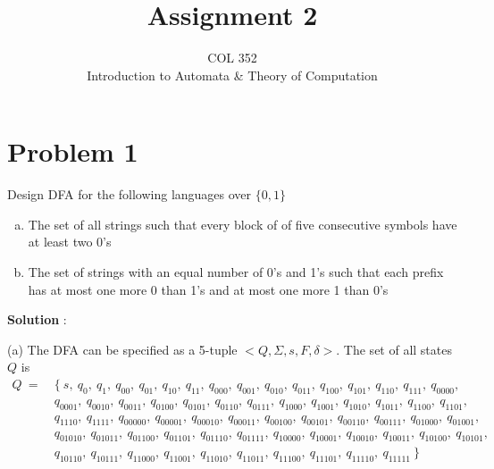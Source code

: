 \documentclass{article}
\title{Assignment 2}
\author{COL 352\\
    Introduction to Automata \& 
    Theory of Computation}
\date{}
\begin{document}
    \maketitle
    
    \section*{Problem 1} Design DFA for the following languages over $\{0, 1\}$
    \begin{enumerate}[(a)]
        \item The set of all strings such that every block of of five consecutive symbols have at least two 0’s
        \item The set of strings with an equal number of 0’s and 1’s such that each prefix has at most one more 0 than
1’s and at most one more 1 than 0’s
    \end{enumerate}
    
    \textbf{Solution} : 
    
    (a) The DFA can be specified as a 5-tuple $<Q, \Sigma, s, F, \delta>$. The set of all states $Q$ is
    \begin{equation}
    \begin{aligned}
    Q~  = ~&\{\  s,~  q_{0},~  q_{1},~  q_{00},~  q_{01},~  q_{10},~
      q_{11},~  q_{000},~  q_{001},~  q_{010},~  q_{011},~  q_{100},~  q_{101},~  q_{110},~  q_{111},~  q_{0000},~ \\
      & q_{0001},~  q_{0010},~  q_{0011},~  q_{0100},~  q_{0101},~q_{0110},~  q_{0111},~  q_{1000},~  q_{1001},~  q_{1010},~  q_{1011},~  q_{1100},~  q_{1101},~ \\
      &  q_{1110},~  q_{1111},~  q_{00000},~  q_{00001},~  q_{00010},~  q_{00011},~q_{00100},~  q_{00101},~  q_{00110},~  q_{00111},~  q_{01000},~  q_{01001},~ \\
      & q_{01010},~  q_{01011},~   q_{01100},~  q_{01101},~  q_{01110},~  q_{01111},~  q_{10000},~  q_{10001},~q_{10010},~  q_{10011},~  q_{10100},~  q_{10101},~\\
      &  q_{10110},~  q_{10111},~  q_{11000},~  q_{11001},~ q_{11010},~  q_{11011},~  q_{11100},~  q_{11101},~  q_{11110},~q_{11111}\ \} \nonumber
    \end{aligned}
    \end{equation}
    
\end{document}
